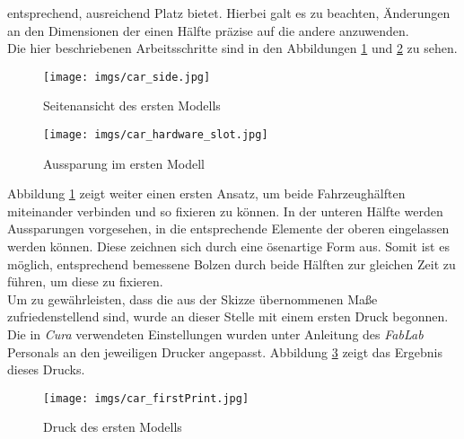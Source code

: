 \documentclass[.../Dokumentation.tex]{subfiles}
\begin{document}
entsprechend, ausreichend Platz bietet.
Hierbei galt es zu beachten, Änderungen an den Dimensionen der einen 
Hälfte präzise auf die andere anzuwenden.\\
Die hier beschriebenen Arbeitsschritte sind in den Abbildungen 
\ref{fig-car-side} und \ref{fig-car-slot} zu sehen.
\begin{figure}[H]
\begin{center}
    \texttt{[image: imgs/car\_side.jpg]}
    \caption{Seitenansicht des ersten Modells}
    \label{fig-car-side}
\end{center}
\end{figure}
\begin{figure}[H]
\begin{center}
    \texttt{[image: imgs/car\_hardware\_slot.jpg]}
    \caption{Aussparung im ersten Modell}
    \label{fig-car-slot}
\end{center}
\end{figure}
\noindent
Abbildung \ref{fig-car-side} zeigt weiter einen ersten Ansatz, um beide 
Fahrzeughälften miteinander verbinden und so fixieren zu können. 
In der unteren Hälfte werden Aussparungen vorgesehen, in die entsprechende 
Elemente der oberen eingelassen werden können. Diese zeichnen sich durch eine 
ösenartige Form aus. Somit ist es möglich, entsprechend bemessene Bolzen durch 
beide Hälften zur gleichen Zeit zu führen, um diese zu fixieren.\\
Um zu gewährleisten, dass die aus der Skizze übernommenen Maße 
zufriedenstellend sind, wurde an dieser Stelle mit einem ersten Druck begonnen.
Die in \textit{Cura} verwendeten Einstellungen wurden unter Anleitung 
des \textit{FabLab} Personals an den jeweiligen Drucker angepasst. 
Abbildung \ref{fig-car-firstPrint} zeigt das Ergebnis dieses Drucks.
\begin{figure}[H]
    \begin{center}
        \texttt{[image: imgs/car\_firstPrint.jpg]}
        \caption{Druck des ersten Modells}
        \label{fig-car-firstPrint}
    \end{center}
    \end{figure}
\end{document}
